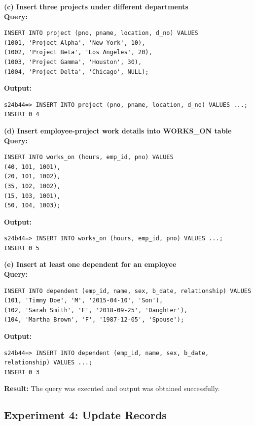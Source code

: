 \documentclass[12pt, a4paper]{article}
\begin{document}
\textbf{(c) Insert three projects under different departments}\\
\textbf{Query:}
\begin{lstlisting}
INSERT INTO project (pno, pname, location, d_no) VALUES
(1001, 'Project Alpha', 'New York', 10),
(1002, 'Project Beta', 'Los Angeles', 20),
(1003, 'Project Gamma', 'Houston', 30),
(1004, 'Project Delta', 'Chicago', NULL);
\end{lstlisting}
\textbf{Output:}
\begin{lstlisting}[style=terminal]
s24b44=> INSERT INTO project (pno, pname, location, d_no) VALUES ...;
INSERT 0 4
\end{lstlisting}

\textbf{(d) Insert employee-project work details into WORKS\_ON table}\\
\textbf{Query:}
\begin{lstlisting}
INSERT INTO works_on (hours, emp_id, pno) VALUES
(40, 101, 1001),
(20, 101, 1002),
(35, 102, 1002),
(15, 103, 1001),
(50, 104, 1003);
\end{lstlisting}
\textbf{Output:}
\begin{lstlisting}[style=terminal]
s24b44=> INSERT INTO works_on (hours, emp_id, pno) VALUES ...;
INSERT 0 5
\end{lstlisting}

\textbf{(e) Insert at least one dependent for an employee}\\
\textbf{Query:}
\begin{lstlisting}
INSERT INTO dependent (emp_id, name, sex, b_date, relationship) VALUES
(101, 'Timmy Doe', 'M', '2015-04-10', 'Son'),
(102, 'Sarah Smith', 'F', '2018-09-25', 'Daughter'),
(104, 'Martha Brown', 'F', '1987-12-05', 'Spouse');
\end{lstlisting}
\textbf{Output:}
\begin{lstlisting}[style=terminal]
s24b44=> INSERT INTO dependent (emp_id, name, sex, b_date, relationship) VALUES ...;
INSERT 0 3
\end{lstlisting}
\textbf{Result:} The query was executed and output was obtained successfully.


\newpage
\subsection*{Experiment 4: Update Records}
\end{document}
